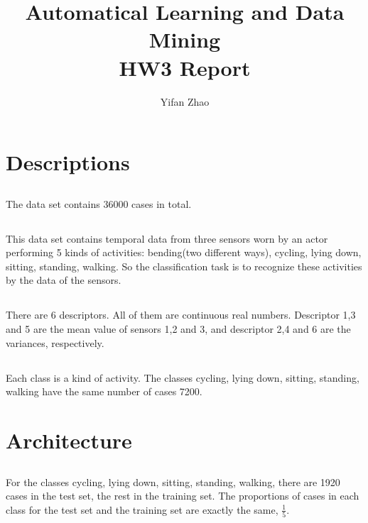 \documentclass{article}
\author{Yifan Zhao}
\title{Automatical Learning and Data Mining\\HW3 Report}
\begin{document}
 \maketitle
 \section{Descriptions}
 \subsection{}The data set contains 36000 cases in total.
 \subsection{}This data set contains temporal data from three sensors worn by an actor performing 5 kinds of activities: bending(two different ways), cycling, lying down, sitting, standing, walking. So the classification task is to recognize these activities by the data of the sensors.
 \subsection{}There are 6 descriptors. All of them are continuous real numbers. Descriptor 1,3 and 5 are the mean value of sensors 1,2 and 3, and descriptor 2,4 and 6 are the variances, respectively.
 \subsection{}Each class is a kind of activity. The classes cycling, lying down, sitting, standing, walking have the same number of cases 7200.
 \section{Architecture}
 \subsection{}For the classes cycling, lying down, sitting, standing, walking, there are 1920 cases in the test set, the rest in the training set. The proportions of cases in each class for the test set and the training set are exactly the same, $\frac{1}{5}$.
\end{document}

